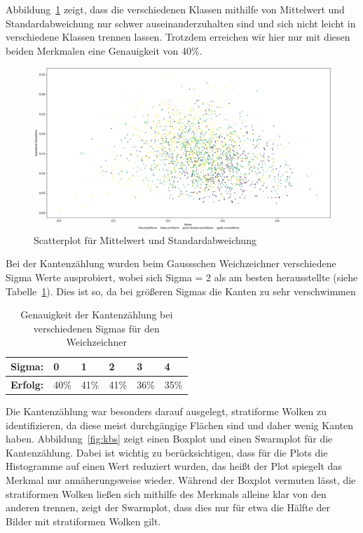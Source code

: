 \documentclass[a4,german]{article}
\begin{document}
Abbildung~\ref{fig:meanstd} zeigt, dass die verschiedenen Klassen mithilfe von Mittelwert und Standardabweichung nur schwer auseinanderzuhalten sind und sich nicht leicht in verschiedene Klassen trennen lassen. Trotzdem erreichen wir hier nur mit diesen beiden Merkmalen eine Genauigkeit von 40\%.
\begin{figure}[h!]
\hspace*{-3cm}
\includegraphics[width=1.5\textwidth]{Scatterplot_mean_std.png}
\caption{Scatterplot für Mittelwert und Standardabweichung}
\label{fig:meanstd}
\end{figure}

Bei der Kantenzählung wurden beim Gaussschen Weichzeichner verschiedene Sigma Werte ausprobiert, wobei sich Sigma = 2 als am besten herausstellte (siehe Tabelle~\ref{tab:sigma}).
Dies ist so, da bei größeren Sigmas die Kanten zu sehr verschwimmen %
\begin{table}[h]
\centering
\begin{tabular}{|l|l|l|l|l|l|}
 \hline
 \textbf{Sigma:} & 0 & 1 & 2 & 3 & 4\\
 \hline
 \textbf{Erfolg:} & 40\% & 41\% & 41\% & 36\% & 35\% \\
 \hline
\end{tabular}
\caption{Genauigkeit der Kantenzählung bei verschiedenen Sigmas für den Weichzeichner}
\label{tab:sigma}
\end{table}

Die Kantenzählung war besonders darauf ausgelegt, stratiforme Wolken %
zu identifizieren, da diese meist durchgängige Flächen sind und daher wenig Kanten haben.
Abbildung~\ref{fig:kbs} zeigt einen Boxplot und einen Swarmplot für die Kantenzählung.
Dabei ist wichtig zu berücksichtigen, dass für die Plots die Histogramme auf einen Wert reduziert wurden, das heißt der Plot spiegelt das Merkmal nur annäherungsweise wieder.
Während der Boxplot vermuten lässt, die stratiformen Wolken ließen sich mithilfe des Merkmals alleine klar von den anderen trennen, zeigt der Swarmplot, dass dies nur für etwa die Hälfte der Bilder mit stratiformen Wolken gilt. %
\end{document}
